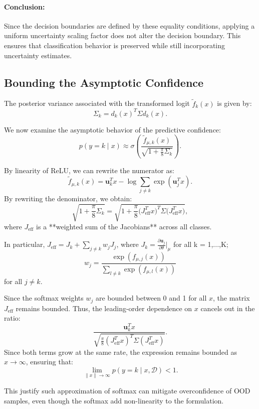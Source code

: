 \documentclass{article}
\begin{document}
\paragraph{Conclusion:}
Since the decision boundaries are defined by these equality conditions, applying a uniform uncertainty scaling factor does not alter the decision boundary. This ensures that classification behavior is preserved while still incorporating uncertainty estimates.


\subsection{Bounding the Asymptotic Confidence}

The posterior variance associated with the transformed logit \( \tilde{f}_k(x) \) is given by:
\begin{equation}
    \Sigma_k = d_k(x)^T \Sigma d_k(x).
\end{equation}

We now examine the asymptotic behavior of the predictive confidence:
\begin{equation}
    p(y = k \mid x) \approx \sigma\left( \frac{\tilde{f}_{\mu,k}(x)}{\sqrt{1+\frac{\pi}{8} \Sigma_k}} \right).
\end{equation}

By linearity of ReLU, we can rewrite the numerator as:
\begin{equation}
    \tilde{f}_{\mu,k}(x) = \mathbf{u}_k^{T} x - \log \sum_{j \neq k} \exp(\mathbf{u}_j^{T} x).
\end{equation}
By rewriting the denominator, we obtain:
\begin{equation}
    \sqrt{1+\frac{\pi}{8} \Sigma_k} = \sqrt{1+\frac{\pi}{8} \big( J_{\text{eff}}^{T} x \big)^T \Sigma \big( J_{\text{eff}}^{T} x \big)},
\end{equation}
where \( J_{\text{eff}} \) is a **weighted sum of the Jacobians** across all classes.

In particular, $J_{\text{eff}} =  J_k + \sum_{j \neq k }w_j J_j$,
where $J_k = \frac{\partial \mathbf{u}_j}{\partial \theta}\big|_{\mu}$ for all k = 1,...,K; $$w_j = \frac{\exp(f_{\mu,j}(x))}{\sum_{l \neq k}\exp(f_{\mu,l}(x))}$$ for all $j \neq k$.

Since the softmax weights \( w_j \) are bounded between 0 and 1 for all \( x \), the matrix \( J_{\text{eff}} \) remains bounded. Thus, the leading-order dependence on \( x \) cancels out in the ratio:
\begin{equation}
    \frac{\mathbf{u}_k^{T} x}{\sqrt{\frac{\pi}{8} (J_{\text{eff}}^{T} x)^T \Sigma (J_{\text{eff}}^{T} x)}}.
\end{equation}
Since both terms grow at the same rate, the expression remains bounded as \( x \to \infty \), ensuring that:
\begin{equation}
    \lim_{\|x\| \to \infty} p(y = k \mid x, \mathcal{D}) < 1.
\end{equation}

This justify such approximation of softmax can mitigate overconfidence of OOD samples, even though the softmax add non-linearity to the formulation.
\end{document}
